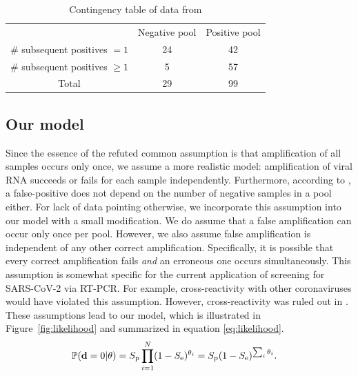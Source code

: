 \documentclass{article}
\begin{document}
\begin{table}[h]
\centering
\begin{tabular}{ c c c }
                                & Negative pool  & Positive pool \\%
\# subsequent positives $=1$    & 24             & 42            \\%
\# subsequent positives $\geq1$ & 5              & 57            \\%
 Total                          & 29             & 99            \\%
\end{tabular}
\caption{Contingency table of data from \cite{Salazar}}\label{table}
\end{table}


\subsection*{Our model}\label{subsec:ours}
Since the essence of the refuted common assumption is that
amplification of all samples occurs only once, we assume a more
realistic model: amplification of viral RNA succeeds or fails for each
sample independently. Furthermore, according to \cite{Simplistic1,
  Simplistic2, Kim, OptimalDorfmanPool}, a false-positive does not
depend on the number of negative samples in a pool either. For lack of
data pointing otherwise, we incorporate this assumption into our model
with a small modification. We do assume that a false amplification can
occur only once per pool. However, we also assume false amplification
is independent of any other correct amplification. Specifically, it is
possible that every correct amplification fails \emph{and} an
erroneous one occurs simultaneously. This assumption is somewhat
specific for the current application of screening for SARS-CoV-2 via
RT-PCR. For example, cross-reactivity with other coronaviruses would
have violated this assumption. However, cross-reactivity was ruled out
in \cite{KitComparison}. These assumptions lead to our model, which is
illustrated in Figure~\ref{fig:likelihood} and summarized in
equation \eqref{eq:likelihood}.
\begin{align}\label{eq:likelihood}
    \mathbb{P}(\mathbf{d}=0 | \theta) &= S_{\text{p}}\prod_{i=1}^N (1-S_{\text{e}})^{\theta_i} =
    S_{\text{p}}(1-S_\text{e})^{\sum_i\theta_i}.
\end{align}
\end{document}
